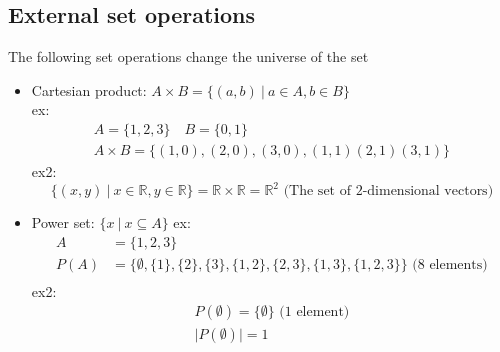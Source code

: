 \documentclass{article}
\begin{document}
\subsection{External set operations}
The following set operations change the universe of the set
\begin{itemize}
    \item Cartesian product: $A \times B = \{(a,b) \ | \ a\in A, b\in B\}$ \\
          ex: \begin{gather*}
              A = \{1,2,3\} \quad B = \{0,1\} \\
              A \times B = \{(1,0), (2,0),(3,0),(1,1)(2,1)(3,1)\}
          \end{gather*}
          ex2: \[
              \{(x,y)\ \vert \ x\in \mathbb{R} , y \in \mathbb{R} \} = \mathbb{R} \times \mathbb{R} = \mathbb{R} ^{2} \text{ (The set of 2-dimensional vectors)}
          \]
    \item Power set: $\{x \ \vert \ x \subseteq A\}$ 
          ex: \begin{align*}
              A    & = \{1,2,3\}                                                                                   \\
              P(A) & = \{\emptyset , \{1\}, \{2\}, \{3\}, \{1,2\}, \{2,3\},\{1,3\},\{1,2,3\}\}\text{ (8 elements)} \\
          \end{align*}
          ex2: \begin{gather*}
              P(\emptyset ) = \{\emptyset \} \text{ (1 element)} \\
              \lvert P(\emptyset ) \rvert = 1
          \end{gather*}
\end{itemize}
\end{document}

